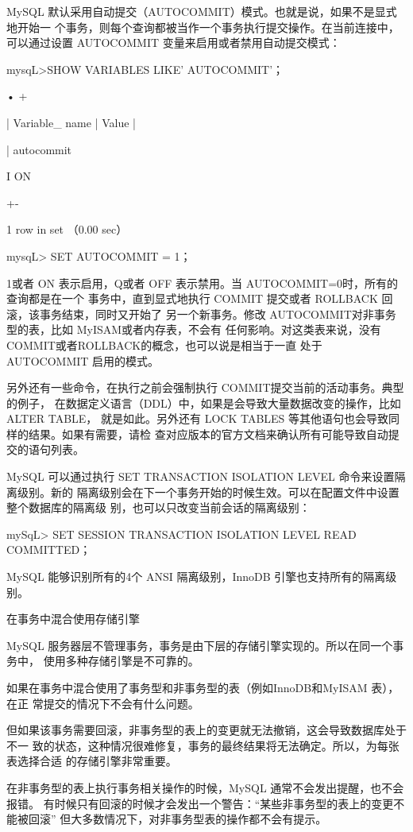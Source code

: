 MySQL 默认采用自动提交（AUTOCOMMIT）模式。也就是说，如果不是显式地开始一
个事务，则每个查询都被当作一个事务执行提交操作。在当前连接中，可以通过设置
AUTOCOMMIT 变量来启用或者禁用自动提交模式：

mysqL>SHOW VARIABLES LIKE' AUTOCOMMIT'；

• +

| Variable\_ name | Value |

| autocommit

I ON

+-

1 row in set （0.00 sec）

mysqL> SET AUTOCOMMIT = 1；

1或者 ON 表示启用，Q或者 OFF 表示禁用。当 AUTOCOMMIT=0时，所有的查询都是在一个
事务中，直到显式地执行 COMMIT 提交或者 ROLLBACK 回滚，该事务结束，同时又开始了
另一个新事务。修改 AUTOCOMMIT对非事务型的表，比如 MyISAM或者内存表，不会有
任何影响。对这类表来说，没有COMMIT或者ROLLBACK的概念，也可以说是相当于一直
处于 AUTOCOMMIT 启用的模式。

另外还有一些命令，在执行之前会强制执行 COMMIT提交当前的活动事务。典型的例子，
在数据定义语言（DDL）中，如果是会导致大量数据改变的操作，比如 ALTER TABLE，
就是如此。另外还有 LOCK TABLES 等其他语句也会导致同样的结果。如果有需要，请检
查对应版本的官方文档来确认所有可能导致自动提交的语句列表。

MySQL 可以通过执行 SET TRANSACTION ISOLATION LEVEL 命令来设置隔离级别。新的
隔离级别会在下一个事务开始的时候生效。可以在配置文件中设置整个数据库的隔离级
别，也可以只改变当前会话的隔离级别：

mySqL> SET SESSION TRANSACTION ISOLATION LEVEL READ COMMITTED；

MySQL 能够识别所有的4个 ANSI 隔离级别，InnoDB 引擎也支持所有的隔离级别。

在事务中混合使用存储引擎

MySQL 服务器层不管理事务，事务是由下层的存储引擎实现的。所以在同一个事务中，
使用多种存储引擎是不可靠的。

如果在事务中混合使用了事务型和非事务型的表（例如InnoDB和MyISAM 表），在正
常提交的情况下不会有什么问题。

但如果该事务需要回滚，非事务型的表上的变更就无法撤销，这会导致数据库处于不一
致的状态，这种情况很难修复，事务的最终结果将无法确定。所以，为每张表选择合适
的存储引擎非常重要。

在非事务型的表上执行事务相关操作的时候，MySQL 通常不会发出提醒，也不会报错。
有时候只有回滚的时候才会发出一个警告：“某些非事务型的表上的变更不能被回滚”
但大多数情况下，对非事务型表的操作都不会有提示。

